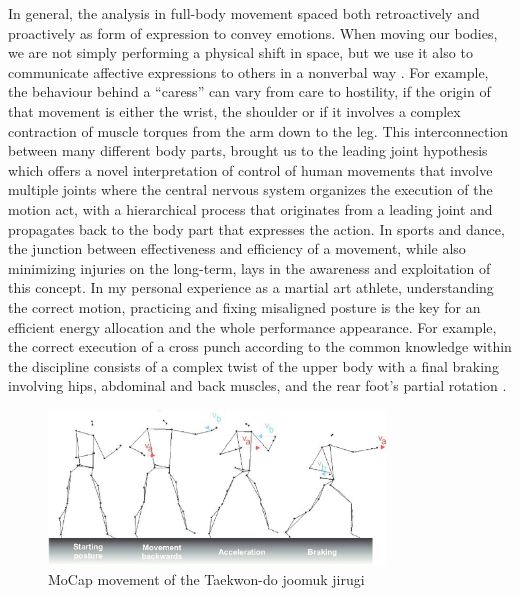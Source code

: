 In general, the analysis in full-body movement spaced both retroactively and proactively as form of expression to convey emotions. 
When moving our bodies, we are not simply performing a physical shift in space, but we use it also to 
communicate affective expressions to others in a nonverbal way \cite{gelder:2009,kleinsmith:2013,karg:2013}. 
For example, the behaviour behind a “caress” can vary from care to hostility, 
if the origin of that movement is either the wrist, the shoulder or if it involves a complex 
contraction of muscle torques from the arm down to the leg. 
This interconnection between many different body parts, brought us to the leading joint hypothesis \cite{dounskaia:2010} 
which offers a novel interpretation of control of human movements that involve multiple joints 
where the central nervous system organizes the execution of the motion act, with a hierarchical process 
that originates from a leading joint and propagates back to the body part that expresses the action. 
In sports and dance, the junction between effectiveness and efficiency of a movement, while also minimizing injuries on the long-term, 
lays in the awareness and exploitation of this concept. 
In my personal experience as a martial art athlete, understanding the correct motion, 
practicing and fixing misaligned posture is the key for an efficient energy allocation and the whole performance appearance. 
For example, the correct execution of a cross punch according to the common 
knowledge within the discipline consists of a complex 
twist of the upper body with a final braking involving hips, abdominal and back muscles, 
and the rear foot’s partial rotation \cite{wasik:2013}.
\begin{figure}[H]
    \centering
    \includegraphics[width=0.8\textwidth]{graphics/Taekwon-do-joomuk-jirugi.jpeg}
    \caption{MoCap movement of the Taekwon-do joomuk jirugi}
    \label{fig:example}
\end{figure}

